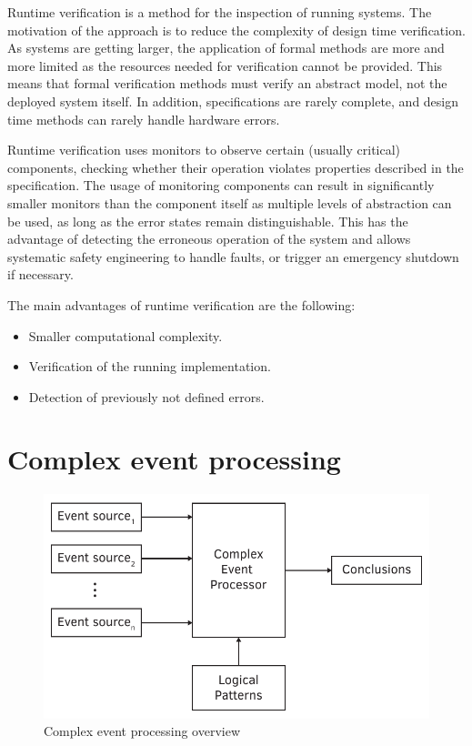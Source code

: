 Runtime verification is a method for the inspection of running systems. The motivation of the approach
is to reduce the complexity of design time verification. 
As systems are getting larger, the application of formal methods are more and more limited as the resources needed for verification cannot be provided. This means that formal verification methods must verify an abstract model, not the deployed system itself. In addition, specifications are rarely complete, and design time methods can rarely handle hardware errors. %

Runtime verification uses monitors to observe certain (usually critical) components, checking whether their operation violates properties described in the specification. The usage of monitoring components can result in significantly smaller monitors than the component itself as multiple levels of abstraction can be used, as long as the error states remain distinguishable. This has the advantage of detecting the erroneous operation of the system and allows systematic safety engineering to handle faults, or trigger an emergency shutdown if necessary.

The main advantages of runtime verification are the following:

\begin{itemize}
	\item Smaller computational complexity.
	\item Verification of the running implementation.
	\item Detection of previously not defined errors.
\end{itemize}

\section{Complex event processing}

\begin{figure}[h]
	\centering
	\includegraphics[width=0.6\linewidth]{figures/chapter_2/CEP}
	\caption{Complex event processing overview}
	\label{fig:intro:cep}
\end{figure}

